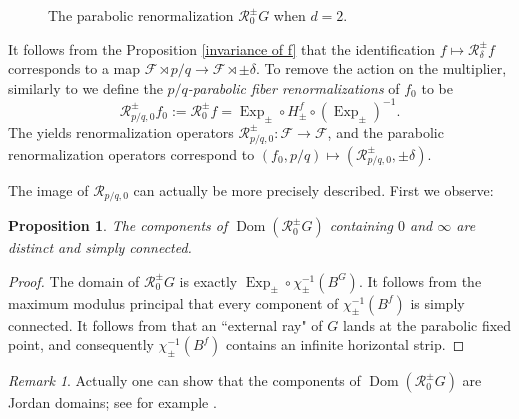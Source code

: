 \documentclass[12pt,letterpaper]{amsart}
\numberwithin{equation}{section}
\newtheorem{prop}[equation]{Proposition}
\theoremstyle{remark}
\newtheorem{remark}[equation]{Remark}
\theoremstyle{definition}
\newcommand{\FF}{\mathcal F}
\newcommand{\RR}{\mathcal R}
\DeclareMathOperator{\Dom}{Dom}
\DeclareMathOperator{\Exp}{Exp}
\begin{document}
	
	\begin{figure}
		\begin{center}
			\def\svgwidth{12.5cm}
			
			\caption{The parabolic renormalization $\mathcal{R}_0^\pm G$ when $d = 2$.}
			\label{renormalization of G}
		\end{center}
	\end{figure}
	
	It follows from the Proposition \ref{invariance of f} that the identification $f\mapsto \RR_\delta^\pm f$ corresponds to a map $\FF\rtimes p/q\to \FF\rtimes \pm\delta$. To remove the action on the multiplier, similarly to  \cite{shishikura} we define the \textit{$p/q$-parabolic fiber renormalizations} of $f_0$ to be 
	$$\RR_{p/q, 0}^\pm f_0 :=\RR_0^\pm f = \Exp_\pm \circ H_\pm^f\circ (\Exp_\pm)^{-1}.$$
	The yields renormalization operators $\RR_{p/q, 0}^\pm:\FF\to \FF$, and the parabolic renormalization operators correspond to $(f_0, p/q)\mapsto (\RR_{p/q, 0}^\pm, \pm \delta).$
	
	
	The image of $\mathcal{R}_{p/q, 0}$ can actually be more precisely described. First we observe:
	\begin{prop}
		The components of $\Dom(\RR_0^\pm G)$ containing $0$ and $\infty$ are distinct and simply connected. 
	\end{prop}
	
	\begin{proof}
		The domain of $\RR_0^\pm G$ is exactly $\Exp_\pm\circ \chi_\pm^{-1}(B^G).$
		It follows from the maximum modulus principal that every component of $\chi_\pm^{-1}(B^f)$ is simply connected.  It follows from \cite{Orsay1} that an ``external ray" of $G$ lands at the parabolic fixed point, and consequently $\chi_\pm^{-1}(B^f)$ contains an infinite horizontal strip.
	\end{proof}
	
	\begin{remark}
		Actually one can show that the components of $\Dom(\RR_0^\pm G)$ are Jordan domains; see for example \cite{lanford}.
	\end{remark}
	
\end{document}
